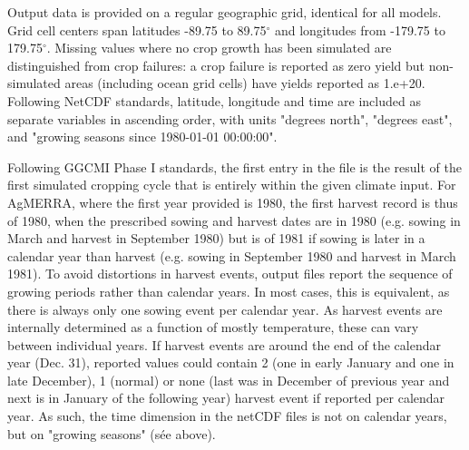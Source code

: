 \documentclass[gmd, manuscript]{copernicus} %
\begin{document}
Output data is provided on a regular geographic grid, identical for all models. 
Grid cell centers span latitudes -89.75 to 89.75$^{\circ}$ and longitudes from -179.75 to 179.75$^{\circ}$. 
Missing values  where no crop growth has been simulated are distinguished from crop failures: a crop failure is reported as zero yield but non-simulated areas (including ocean grid cells) have yields reported as 1.e+20. 
Following NetCDF standards, latitude, longitude and time are included as separate variables in ascending order, with
units "degrees north", "degrees east", and "growing seasons since 1980-01-01 00:00:00". 

Following GGCMI Phase I standards, the first entry in the file is the result of the first simulated cropping cycle that is entirely within the given climate input. 
For AgMERRA, where the first year provided is 1980, the first harvest record is thus of 1980, when the prescribed sowing and harvest dates are in 1980 (e.g. sowing in March and harvest in September 1980) but is of 1981 if sowing is later in a calendar year than harvest (e.g. sowing in September 1980 and harvest in March 1981). 
To avoid distortions in harvest events, output files report the sequence of growing periods rather than calendar years. 
In most cases, this is equivalent, as there is always only one sowing event per calendar year.
As harvest events are internally determined as a function of mostly temperature, these can vary between individual years. 
If harvest events are around the end of the calendar year (Dec. 31), reported values could contain 2 (one in early January and one in late December), 1 (normal) or none (last was in December of previous year and next is in January of the following year) harvest event if reported per calendar year.
As such, the time dimension in the netCDF files is not on calendar years, but on "growing seasons" (sée above).
\end{document}
